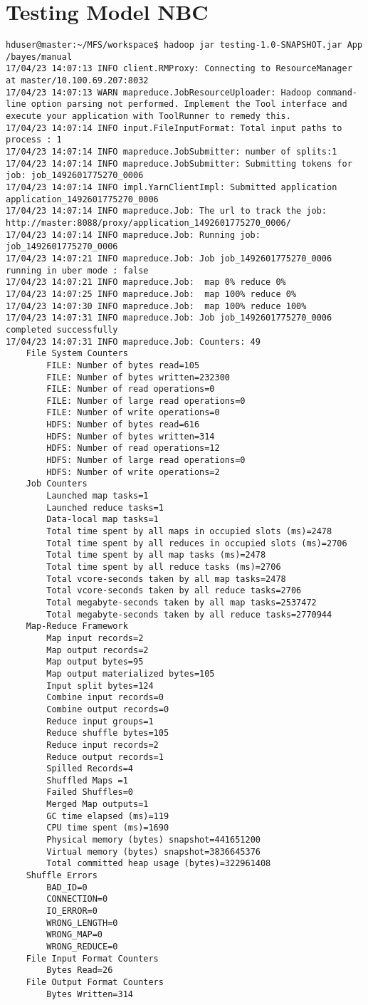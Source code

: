 \section{Testing Model NBC}
\begin{lstlisting}
hduser@master:~/MFS/workspace$ hadoop jar testing-1.0-SNAPSHOT.jar App /bayes/manual
17/04/23 14:07:13 INFO client.RMProxy: Connecting to ResourceManager at master/10.100.69.207:8032
17/04/23 14:07:13 WARN mapreduce.JobResourceUploader: Hadoop command-line option parsing not performed. Implement the Tool interface and execute your application with ToolRunner to remedy this.
17/04/23 14:07:14 INFO input.FileInputFormat: Total input paths to process : 1
17/04/23 14:07:14 INFO mapreduce.JobSubmitter: number of splits:1
17/04/23 14:07:14 INFO mapreduce.JobSubmitter: Submitting tokens for job: job_1492601775270_0006
17/04/23 14:07:14 INFO impl.YarnClientImpl: Submitted application application_1492601775270_0006
17/04/23 14:07:14 INFO mapreduce.Job: The url to track the job: http://master:8088/proxy/application_1492601775270_0006/
17/04/23 14:07:14 INFO mapreduce.Job: Running job: job_1492601775270_0006
17/04/23 14:07:21 INFO mapreduce.Job: Job job_1492601775270_0006 running in uber mode : false
17/04/23 14:07:21 INFO mapreduce.Job:  map 0% reduce 0%
17/04/23 14:07:25 INFO mapreduce.Job:  map 100% reduce 0%
17/04/23 14:07:30 INFO mapreduce.Job:  map 100% reduce 100%
17/04/23 14:07:31 INFO mapreduce.Job: Job job_1492601775270_0006 completed successfully
17/04/23 14:07:31 INFO mapreduce.Job: Counters: 49
	File System Counters
		FILE: Number of bytes read=105
		FILE: Number of bytes written=232300
		FILE: Number of read operations=0
		FILE: Number of large read operations=0
		FILE: Number of write operations=0
		HDFS: Number of bytes read=616
		HDFS: Number of bytes written=314
		HDFS: Number of read operations=12
		HDFS: Number of large read operations=0
		HDFS: Number of write operations=2
	Job Counters 
		Launched map tasks=1
		Launched reduce tasks=1
		Data-local map tasks=1
		Total time spent by all maps in occupied slots (ms)=2478
		Total time spent by all reduces in occupied slots (ms)=2706
		Total time spent by all map tasks (ms)=2478
		Total time spent by all reduce tasks (ms)=2706
		Total vcore-seconds taken by all map tasks=2478
		Total vcore-seconds taken by all reduce tasks=2706
		Total megabyte-seconds taken by all map tasks=2537472
		Total megabyte-seconds taken by all reduce tasks=2770944
	Map-Reduce Framework
		Map input records=2
		Map output records=2
		Map output bytes=95
		Map output materialized bytes=105
		Input split bytes=124
		Combine input records=0
		Combine output records=0
		Reduce input groups=1
		Reduce shuffle bytes=105
		Reduce input records=2
		Reduce output records=1
		Spilled Records=4
		Shuffled Maps =1
		Failed Shuffles=0
		Merged Map outputs=1
		GC time elapsed (ms)=119
		CPU time spent (ms)=1690
		Physical memory (bytes) snapshot=441651200
		Virtual memory (bytes) snapshot=3836645376
		Total committed heap usage (bytes)=322961408
	Shuffle Errors
		BAD_ID=0
		CONNECTION=0
		IO_ERROR=0
		WRONG_LENGTH=0
		WRONG_MAP=0
		WRONG_REDUCE=0
	File Input Format Counters 
		Bytes Read=26
	File Output Format Counters 
		Bytes Written=314
\end{lstlisting}